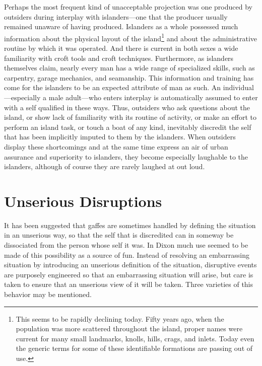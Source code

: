 \documentclass[twoside,symmetric,nobib,justified]{tufte-book}
\begin{document}
Perhaps the most frequent kind of unacceptable projection was one
produced by outsiders during interplay with islanders---one that the
producer usually remained unaware of having produced. Islanders as a
whole possessed much information about the physical layout of the
island\footnote{This seems to be rapidly declining today. Fifty years
  ago, when the population was more scattered throughout the island,
  proper names were current for many small landmarks, knolls, hills,
  crags, and inlets. Today even the generic terms for some of these
  identifiable formations are passing out of use.} and about the
administrative routine by which it was operated. And there is current in
both sexes a wide familiarity with croft tools and croft techniques.
Furthermore, as islanders themselves claim, nearly every man has a wide
range of specialized skills, such as carpentry, garage mechanics, and
seamanship. This information and training has come for the islanders to
be an expected attribute of man as such. An individual---especially a
male adult---who enters interplay is automatically assumed to enter with
a self qualified in these ways. Thus, outsiders who ask questions about
the island, or show lack of familiarity with its routine of activity, or
make an effort to perform an island task, or touch a boat of any kind,
inevitably discredit the self that has been implicitly imputed to them
by the islanders. When outsiders display these shortcomings and at the
same time express an air of urban assurance and superiority to
islanders, they become especially laughable to the islanders, although
of course they are rarely laughed at out loud.

\enlargethispage{\baselineskip}

\hypertarget{unserious-disruptions}{%
\section{Unserious Disruptions}\label{unserious-disruptions}}

It has been suggested that gaffes are sometimes handled by defining the
situation in an unserious way, so that the self that is discredited can
in someway be dissociated from the person whose self it was. In Dixon
much use seemed to be made of this possibility as a source of fun.
Instead of resolving an embarrassing situation by introducing an
unserious definition of the situation, disruptive events are purposely
engineered so that an embarrassing situation will arise, but care is
taken to ensure that an unserious view of it will be taken. Three
varieties of this behavior may be mentioned.
\end{document}
